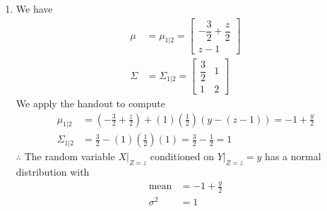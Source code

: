 \documentclass[letterpaper]{article}
\begin{document}
\begin{enumerate}
\item We have
$$\begin{aligned}
\mu &= \mu_{1|2}=\left[\begin{array}{r} -\dfrac{3}{2}+\dfrac{z}{2} \\[2ex] z-1\end{array} \right] \\
\Sigma &= \Sigma_{1|2}=\left[\begin{array}{cc} \dfrac{3}{2} & 1\\[2ex] 1 & 2\end{array} \right]\end{aligned}$$
We apply the handout to compute
$$\begin{aligned}
\mu_{1|2}&=\left(-\frac{3}{2}+\frac{z}{2}\right)+(1)\left(\frac{1}{2}\right)(y-(z-1))=-1+\frac{y}{2} \\[2ex]
\Sigma_{1|2}&=\frac{3}{2}-(1)\left(\frac{1}{2}\right)(1)=\frac{3}{2}-\frac{1}{2}=1
\end{aligned}$$
$\therefore$ The random variable $X\big|_{Z=z}$ conditioned on $Y\big|_{Z=z}=y$ has a normal distribution with
$$\begin{aligned}
\text{mean}&=-1+\frac{y}{2} \\
\sigma^2 &= 1
\end{aligned}$$


\end{enumerate}
\end{document}
